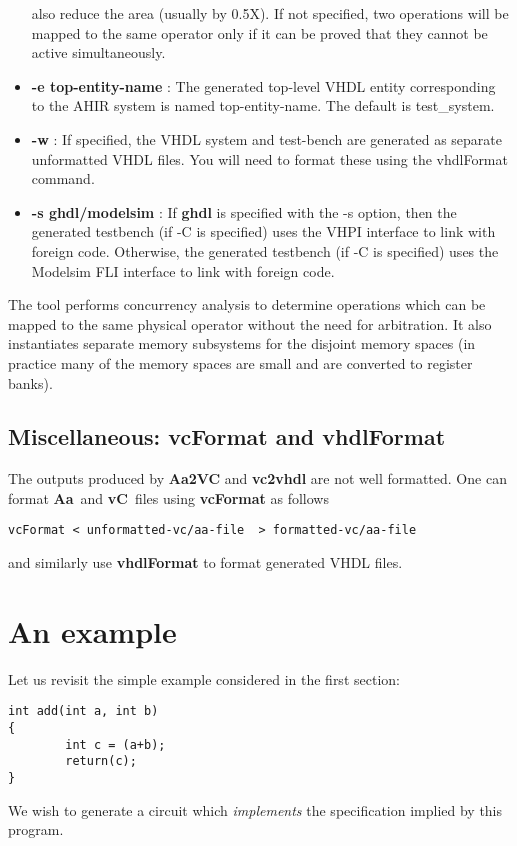 \documentclass{article}
\newcommand{\Aa}{{\bf Aa}~}
\newcommand{\vC}{{\bf vC}~}
\begin{document}
\begin{itemize}
also reduce the area (usually by 0.5X).  If not specified,
two operations will be mapped to the same
operator  only if it can be proved that they cannot be active simultaneously.
\item {\bf -e top-entity-name} : The generated top-level VHDL entity
corresponding to the AHIR system is named top-entity-name.  The default
is test\_system.
\item {\bf -w} :  If specified, the VHDL system and test-bench are
generated as separate unformatted VHDL files.  You will need to
format these using the vhdlFormat command.
\item {\bf -s ghdl/modelsim} :  If {\bf ghdl} is specified
with the -s option, then the generated testbench (if -C is specified)
uses the VHPI interface to link with foreign code.  Otherwise,
the generated testbench (if -C is specified) uses the Modelsim FLI
interface to link with foreign code.
\end{itemize}

The tool performs concurrency analysis to determine operations which
can be mapped to the same physical operator without the need for
arbitration.  It also instantiates separate memory subsystems for
the disjoint memory spaces (in practice many of the memory spaces
are small and are converted to register banks).

\subsection{Miscellaneous: {\bf vcFormat} and {\bf vhdlFormat}}

The outputs produced by {\bf Aa2VC} and {\bf vc2vhdl} are
not well formatted.  One can format \Aa and \vC files
using  {\bf vcFormat} as follows
\begin{verbatim}
vcFormat < unformatted-vc/aa-file  > formatted-vc/aa-file
\end{verbatim}
and similarly use {\bf vhdlFormat} to format generated
VHDL files.


\section{An example} \label{sec:Example}

Let us revisit the simple example considered in
the first section:
\begin{verbatim}
int add(int a, int b)
{
        int c = (a+b);
        return(c);
}
\end{verbatim}
We wish to generate a circuit which {\em implements}
the specification implied by this program.
\end{document}

